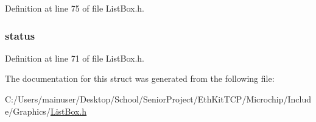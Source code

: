 Definition at line 75 of file List\+Box.\+h.

\hypertarget{struct_l_i_s_t_i_t_e_m_ae9b729593cbf756556fd43454ade403f}{}
\subsubsection[{status}]{ status}\label{struct_l_i_s_t_i_t_e_m_ae9b729593cbf756556fd43454ade403f}


Definition at line 71 of file List\+Box.\+h.



The documentation for this struct was generated from the following file\+:\begin{DoxyCompactItemize}
\item 
C\+:/\+Users/mainuser/\+Desktop/\+School/\+Senior\+Project/\+Eth\+Kit\+T\+C\+P/\+Microchip/\+Include/\+Graphics/\hyperlink{_list_box_8h}{List\+Box.\+h}\end{DoxyCompactItemize}
